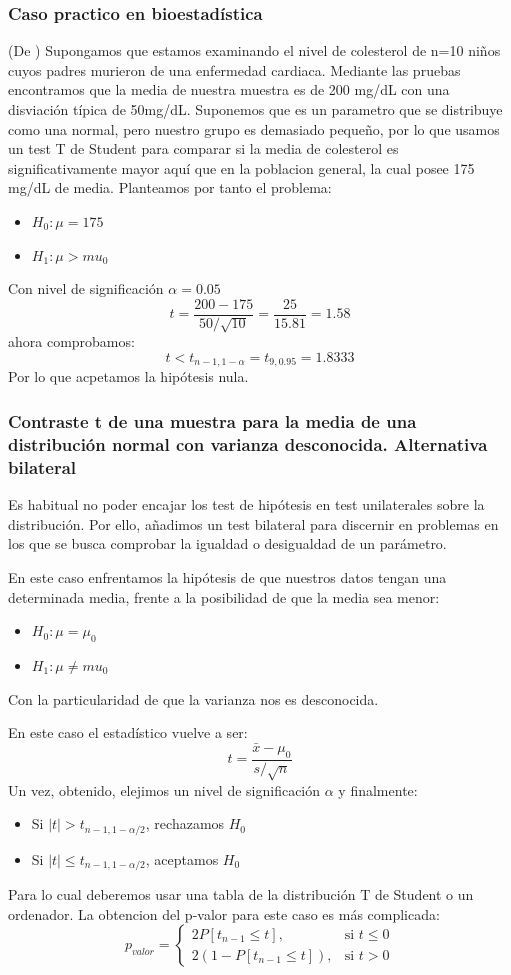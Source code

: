 \documentclass[a4paper,12pt]{article}
\begin{document}
 \subsubsection*{Caso practico en bioestadística}
 (De \cite{rosner2015fundamentals}) 
Supongamos que estamos examinando el nivel de colesterol de n=10 niños cuyos padres murieron de una enfermedad cardiaca. Mediante las pruebas encontramos que la media de nuestra muestra es de 200 mg/dL con una disviación típica de 50mg/dL. Suponemos que es un parametro que se distribuye como una normal, pero nuestro grupo es demasiado pequeño, por lo que usamos un test T de Student para comparar si la media de colesterol es significativamente mayor aquí que en la poblacion general, la cual posee 175 mg/dL de media.
Planteamos por tanto el problema:
\begin{itemize}
	\item $H_0:\mu=175$
	\item $H_1: \mu>mu_0$
\end{itemize}
Con nivel de significación $\alpha=0.05$
$$t=\frac{200-175}{50/\sqrt{10}}=\frac{25}{15.81}=1.58$$
ahora comprobamos:
$$t<t_{n-1,1-\alpha}=t_{9,0.95}=1.8333$$
Por lo que acpetamos la hipótesis nula.

\subsubsection{Contraste t de una muestra para la media de una distribución normal con varianza desconocida. Alternativa bilateral}
Es habitual no poder encajar los test de hipótesis en test unilaterales sobre la distribución. Por ello, añadimos un test bilateral para discernir en problemas en los que se busca comprobar la igualdad o desigualdad de un parámetro.

En este caso enfrentamos la hipótesis de que nuestros datos tengan una determinada media, frente a la posibilidad  de que la media sea menor: 
\begin{itemize}
	\item $H_0:\mu=\mu_0$
	\item $H_1: \mu\neq mu_0$
\end{itemize}
Con la particularidad de que la varianza nos es desconocida.

En este caso el estadístico vuelve a ser: 
$$t=\frac{\bar{x}-\mu_0}{s/\sqrt{n}}$$
Un vez, obtenido, elejimos un nivel de significación $\alpha$ y finalmente:
\begin{itemize}
	\item Si $|t|>t_{n-1,1-\alpha/2}$, rechazamos $H_0$
	\item Si $|t|\leq t_{n-1,1-\alpha/2}$, aceptamos $H_0$
\end{itemize}
Para lo cual deberemos usar una tabla de la distribución T de Student o un ordenador.
La obtencion del p-valor para este caso es más complicada:
$$p_{valor} = \begin{cases} 2P[t_{n-1}\leq t], & \mbox{si } t\leq 0 \\ 2(1-P[t_{n-1}\leq t]), & \mbox{si } t>0 \end{cases}$$
\end{document}
